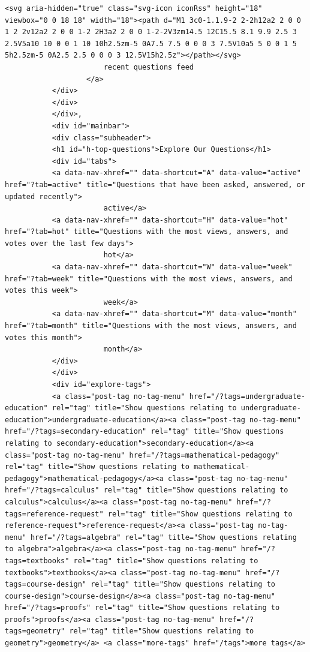 \documentclass[11pt]{article}
\begin{document}
\begin{Verbatim}[commandchars=\\\{\}]
           <svg aria-hidden="true" class="svg-icon iconRss" height="18" viewbox="0 0 18 18" width="18"><path d="M1 3c0-1.1.9-2 2-2h12a2 2 0 0 1 2 2v12a2 2 0 0 1-2 2H3a2 2 0 0 1-2-2V3zm14.5 12C15.5 8.1 9.9 2.5 3 2.5V5a10 10 0 0 1 10 10h2.5zm-5 0A7.5 7.5 0 0 0 3 7.5V10a5 5 0 0 1 5 5h2.5zm-5 0A2.5 2.5 0 0 0 3 12.5V15h2.5z"></path></svg>
                       recent questions feed
                   </a>
           </div>
           </div>
           </div>,
           <div id="mainbar">
           <div class="subheader">
           <h1 id="h-top-questions">Explore Our Questions</h1>
           <div id="tabs">
           <a data-nav-xhref="" data-shortcut="A" data-value="active" href="?tab=active" title="Questions that have been asked, answered, or updated recently">
                       active</a>
           <a data-nav-xhref="" data-shortcut="H" data-value="hot" href="?tab=hot" title="Questions with the most views, answers, and votes over the last few days">
                       hot</a>
           <a data-nav-xhref="" data-shortcut="W" data-value="week" href="?tab=week" title="Questions with the most views, answers, and votes this week">
                       week</a>
           <a data-nav-xhref="" data-shortcut="M" data-value="month" href="?tab=month" title="Questions with the most views, answers, and votes this month">
                       month</a>
           </div>
           </div>
           <div id="explore-tags">
           <a class="post-tag no-tag-menu" href="/?tags=undergraduate-education" rel="tag" title="Show questions relating to undergraduate-education">undergraduate-education</a><a class="post-tag no-tag-menu" href="/?tags=secondary-education" rel="tag" title="Show questions relating to secondary-education">secondary-education</a><a class="post-tag no-tag-menu" href="/?tags=mathematical-pedagogy" rel="tag" title="Show questions relating to mathematical-pedagogy">mathematical-pedagogy</a><a class="post-tag no-tag-menu" href="/?tags=calculus" rel="tag" title="Show questions relating to calculus">calculus</a><a class="post-tag no-tag-menu" href="/?tags=reference-request" rel="tag" title="Show questions relating to reference-request">reference-request</a><a class="post-tag no-tag-menu" href="/?tags=algebra" rel="tag" title="Show questions relating to algebra">algebra</a><a class="post-tag no-tag-menu" href="/?tags=textbooks" rel="tag" title="Show questions relating to textbooks">textbooks</a><a class="post-tag no-tag-menu" href="/?tags=course-design" rel="tag" title="Show questions relating to course-design">course-design</a><a class="post-tag no-tag-menu" href="/?tags=proofs" rel="tag" title="Show questions relating to proofs">proofs</a><a class="post-tag no-tag-menu" href="/?tags=geometry" rel="tag" title="Show questions relating to geometry">geometry</a> <a class="more-tags" href="/tags">more tags</a>

\end{Verbatim}
\end{document}

